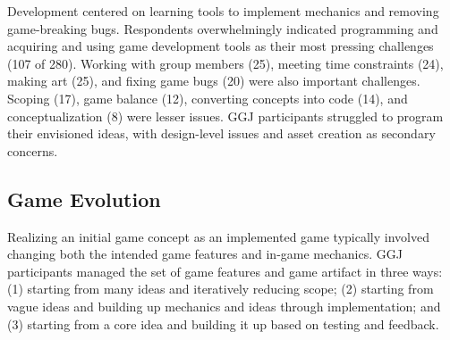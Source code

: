 \documentclass{sig-alternate}
\begin{document}
Development centered on learning tools to implement mechanics and removing game-breaking bugs. 
Respondents overwhelmingly indicated programming and acquiring and using game development tools as their most pressing challenges (107 of 280). 
Working with group members (25), meeting time constraints (24), making art (25), and fixing game bugs (20) were also important challenges. 
Scoping (17), game balance (12), converting concepts into code (14), and conceptualization (8) were lesser issues.
GGJ participants struggled to program their envisioned ideas, with design-level issues and asset creation as secondary concerns.




\subsection{Game Evolution}
Realizing an initial game concept as an implemented game typically involved changing both the intended game features and in-game mechanics. 
GGJ participants managed the set of game features and game artifact in three ways:
(1) starting from many ideas and iteratively reducing scope;
(2) starting from vague ideas and building up mechanics and ideas through implementation;
and
(3) starting from a core idea and building it up based on testing and feedback.
\end{document}
